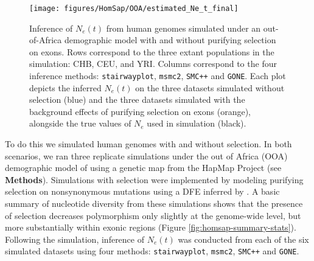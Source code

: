 \documentclass[hidelinks]{article}
\newcommand{\msmc}{\texttt{msmc2}\xspace}
\newcommand{\stairway}{\texttt{stairwayplot}\xspace}
\newcommand{\gone}{\texttt{GONE}\xspace}
\newcommand{\smcpp}{\texttt{SMC++}\xspace}
\begin{document}
    \begin{figure}[b!]
        \centering
        \texttt{[image: figures/HomSap/OOA/estimated\_Ne\_t\_final]}
        \caption{
        \label{fig:human-demography}
        Inference of $N_e(t)$ from human genomes simulated under an out-of-Africa demographic model
        with and without purifying selection on exons.
        Rows correspond to the three extant populations in the simulation: CHB, CEU, and YRI.
        Columns correspond to the four inference methods:
        \stairway, \msmc, \smcpp and \gone.
        Each plot depicts the inferred $N_e(t)$ on the three datasets simulated without selection (blue)
        and the three datasets simulated with the background effects of purifying selection on exons (orange),
        alongside the true values of $N_e$ used in simulation (black).
        }
    \end{figure}

    To do this we simulated human genomes with and without selection.
    In both scenarios, we ran three replicate simulations
    under the out of Africa (OOA) demographic model of
    \citet{ragsdale2019models} using a genetic map from the HapMap Project \citep{international2007second} (see \textbf{Methods}).
    Simulations with selection were implemented by modeling purifying selection on nonsynonymous mutations
    using a DFE inferred by \citet{kim2017inference}.
    A basic summary of nucleotide diversity from these simulations
    shows that the presence of selection decreases polymorphism only slightly
    at the genome-wide level, but more substantially within exonic regions (Figure \ref{fig:homsap-summary-stats}).
    Following the simulation, inference of $N_e(t)$ was conducted from each of the six simulated datasets using four methods:
    \stairway \citep{liu2020stairway}, \msmc \citep{Schiffels2020}, \smcpp \citep{terhorst2017robust} and \gone \citep{santiago2020recent}.
\end{document}
